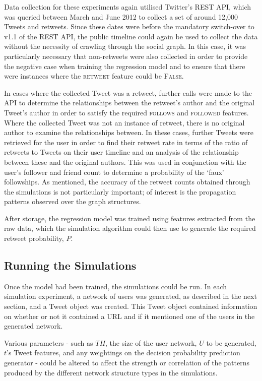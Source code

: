 Data collection for these experiments again utilised Twitter's REST API, which was queried between March and June 2012 to collect a set of around 12,000 Tweets and retweets. Since these dates were before the mandatory switch-over to v1.1 of the REST API, the public timeline could again be used to collect the data without the necessity of crawling through the social graph. In this case, it was particularly necessary that non-retweets were also collected in order to provide the negative case when training the regression model and to ensure that there were instances where the \textsc{retweet} feature could be \textsc{False}.

In cases where the collected Tweet was a retweet, further calls were made to the API to determine the relationships between the retweet's author and the original Tweet's author in order to satisfy the required \textsc{follows} and \textsc{followed} features. Where the collected Tweet was not an instance of retweet, there is no original author to examine the relationships between. In these cases, further Tweets were retrieved for the user in order to find their retweet rate in terms of the ratio of retweets to Tweets on their user timeline and an analysis of the relationship between these and the original authors. This was used in conjunction with the user's follower and friend count to determine a probability of the `faux' followships. As mentioned, the accuracy of the retweet counts obtained through the simulations is not particularly important; of interest is the propagation patterns observed over the graph structures.

After storage, the regression model was trained using features extracted from the raw data, which the simulation algorithm could then use to generate the required retweet probability, $P$.


\subsection{Running the Simulations}
Once the model had been trained, the simulations could be run. In each simulation experiment, a network of users was generated, as described in the next section, and a Tweet object was created. This Tweet object contained information on whether or not it contained a URL and if it mentioned one of the users in the generated network. 

Various parameters - such as $TH$, the size of the user network, $U$ to be generated, $t$'s Tweet features, and any weightings on the decision probability prediction generator - could be altered to affect the strength or correlation of the patterns produced by the different network structure types in the simulations.


